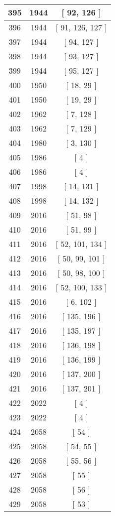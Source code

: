 \begin{center}
\begin{longtable}[H]{|| c c c ||}
\hline
395 & 1944 & [ 92, 126 ] \\ 
\hline
396 & 1944 & [ 91, 126, 127 ] \\ 
\hline
397 & 1944 & [ 94, 127 ] \\ 
\hline
398 & 1944 & [ 93, 127 ] \\ 
\hline
399 & 1944 & [ 95, 127 ] \\ 
\hline
400 & 1950 & [ 18, 29 ] \\ 
\hline
401 & 1950 & [ 19, 29 ] \\ 
\hline
402 & 1962 & [ 7, 128 ] \\ 
\hline
403 & 1962 & [ 7, 129 ] \\ 
\hline
404 & 1980 & [ 3, 130 ] \\ 
\hline
405 & 1986 & [ 4 ] \\ 
\hline
406 & 1986 & [ 4 ] \\ 
\hline
407 & 1998 & [ 14, 131 ] \\ 
\hline
408 & 1998 & [ 14, 132 ] \\ 
\hline
409 & 2016 & [ 51, 98 ] \\ 
\hline
410 & 2016 & [ 51, 99 ] \\ 
\hline
411 & 2016 & [ 52, 101, 134 ] \\ 
\hline
412 & 2016 & [ 50, 99, 101 ] \\ 
\hline
413 & 2016 & [ 50, 98, 100 ] \\ 
\hline
414 & 2016 & [ 52, 100, 133 ] \\ 
\hline
415 & 2016 & [ 6, 102 ] \\ 
\hline
416 & 2016 & [ 135, 196 ] \\ 
\hline
417 & 2016 & [ 135, 197 ] \\ 
\hline
418 & 2016 & [ 136, 198 ] \\ 
\hline
419 & 2016 & [ 136, 199 ] \\ 
\hline
420 & 2016 & [ 137, 200 ] \\ 
\hline
421 & 2016 & [ 137, 201 ] \\ 
\hline
422 & 2022 & [ 4 ] \\ 
\hline
423 & 2022 & [ 4 ] \\ 
\hline
424 & 2058 & [ 54 ] \\ 
\hline
425 & 2058 & [ 54, 55 ] \\ 
\hline
426 & 2058 & [ 55, 56 ] \\ 
\hline
427 & 2058 & [ 55 ] \\ 
\hline
428 & 2058 & [ 56 ] \\ 
\hline
429 & 2058 & [ 53 ] \\ 

\end{longtable}
\end{center}
